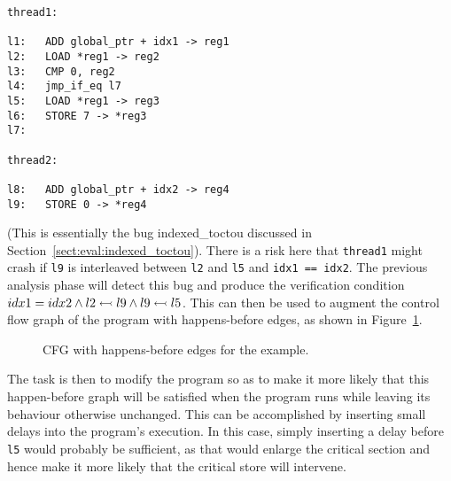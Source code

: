 \begin{verbatim}
thread1:

l1:   ADD global_ptr + idx1 -> reg1
l2:   LOAD *reg1 -> reg2
l3:   CMP 0, reg2
l4:   jmp_if_eq l7
l5:   LOAD *reg1 -> reg3
l6:   STORE 7 -> *reg3
l7:

thread2:

l8:   ADD global_ptr + idx2 -> reg4
l9:   STORE 0 -> *reg4
\end{verbatim}

(This is essentially the bug indexed\_toctou discussed in
Section~\ref{sect:eval:indexed_toctou}).  There is a risk here that
\verb|thread1| might crash if \verb|l9| is interleaved between
\verb|l2| and \verb|l5| and \verb|idx1 == idx2|.  The previous
analysis phase will detect this bug and produce the verification
condition $idx1 = idx2 \wedge l2 \leftarrowtail l9 \wedge l9
\leftarrowtail l5$.  This can then be used to augment the control flow
graph of the program with happens-before edges, as shown in
Figure~\ref{fig:using:example_hb_graph}.

\begin{figure}
  \caption{CFG with happens-before edges for the example.}
  \label{fig:using:example_hb_graph}
\end{figure}

The task is then to modify the program so as to make it more likely
that this happen-before graph will be satisfied when the program runs
while leaving its behaviour otherwise unchanged.  This can be
accomplished by inserting small delays into the program's execution.
In this case, simply inserting a delay before \verb|l5| would probably
be sufficient, as that would enlarge the critical section and hence
make it more likely that the critical store will intervene.

